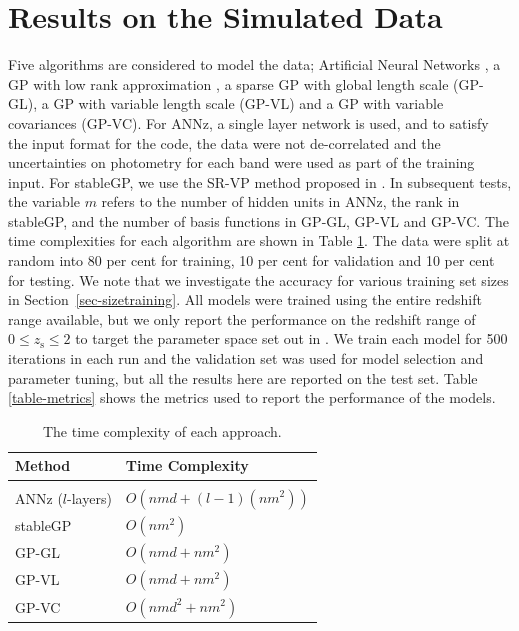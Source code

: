 \documentclass[useAMS,usenatbib,fleqn]{mn2e}
\begin{document}
\section{Results on the Simulated Data}
\label{sec-experiments}

Five algorithms are considered to model the data; Artificial Neural Networks \citep[{\sc ANNz};][]{Collister04}, a GP with low rank approximation \citep[{\sc stableGP};][]{foster2009}, a sparse GP with global length scale (GP-GL), a GP with variable length scale (GP-VL) and a GP with variable covariances (GP-VC). For {\sc ANNz}, a single layer network is used, and to satisfy the input format for the code, the data were not de-correlated and the uncertainties on photometry for each band were used as part of the training input. For {\sc stableGP}, we use the SR-VP method proposed in \citet{foster2009}. In subsequent tests, the variable $m$ refers to the number of hidden units in {\sc ANNz}, the rank in {\sc stableGP}, and the number of basis functions in GP-GL, GP-VL and GP-VC. The time complexities for each algorithm are shown in Table \ref{table-time-complexity}. The data were split at random into 80 per cent for training, 10 per cent for validation and 10 per cent for testing. We note that we investigate the accuracy for various training set sizes in Section~\ref{sec-sizetraining}. All models were trained using the entire redshift range available, but we only report the performance on the redshift range of $0 \le z_\textrm{s} \le 2$ to target the parameter space set out in \cite{laureijs2011}. We train each model for 500 iterations in each run and the validation set was used for model selection and parameter tuning, but all the results here are reported on the test set. Table \ref{table-metrics} shows the metrics used to report the performance of the models.

\begin{table}
\caption{The time complexity of each approach.}
\begin{center}
  \begin{tabular}{| l | l |}
     	Method		&	Time Complexity					\\	\hline				\\
	{\sc ANNz} ($l$-layers)			&	$O\left(nmd+(l-1)(nm^{2})\right)$					\\
	{\sc stableGP}		&	$O\left(nm^{2}\right)$				\\
	GP-GL		&	$O\left(nmd+nm^{2}\right)$		\\	
	GP-VL		&	$O\left(nmd+nm^{2}\right)$		\\	
	GP-VC		&	$O\left(nmd^{2}+nm^{2}\right)$	\\	\hline
  \end{tabular}
\end{center}
\label{table-time-complexity}
\end{table}
\end{document}
